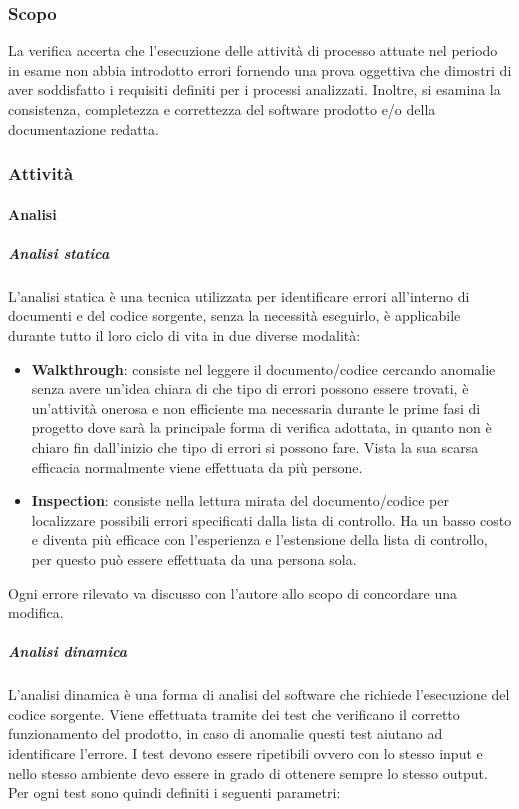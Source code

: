 \subsubsection{Scopo}
La verifica accerta che l'esecuzione delle attività di processo attuate nel periodo in esame non abbia introdotto errori fornendo una prova oggettiva che dimostri di aver soddisfatto i requisiti definiti per i processi analizzati.
Inoltre, si esamina la consistenza, completezza e correttezza del software prodotto e/o della documentazione redatta.
\subsubsection{Attività}
\paragraph{Analisi}
\subparagraph{Analisi statica} \Spazio
L'analisi statica è una tecnica utilizzata per identificare errori all'interno di documenti e del codice sorgente, senza la necessità eseguirlo, è applicabile durante tutto il loro ciclo di vita in due diverse modalità:
\begin{itemize}
	\item \textbf{Walkthrough}:
	      consiste nel leggere il documento/codice cercando anomalie senza avere un'idea chiara di che tipo di errori possono essere trovati, è un'attività onerosa e non efficiente ma necessaria durante le prime fasi di progetto dove sarà la principale forma di verifica adottata, in quanto non è chiaro fin dall'inizio che tipo di errori si possono fare.
	      Vista la sua scarsa efficacia normalmente viene effettuata da più persone.
	\item \textbf{Inspection}:
	      consiste nella lettura mirata del documento/codice per localizzare possibili errori specificati dalla lista di controllo. Ha un basso costo e diventa più efficace con l'esperienza e l'estensione della lista di controllo, per questo può essere effettuata da una persona sola.
\end{itemize}
Ogni errore rilevato va discusso con l'autore allo scopo di concordare una modifica.
\subparagraph{Analisi dinamica} \Spazio
L'analisi dinamica è una forma di analisi del software che richiede l'esecuzione del codice sorgente. Viene effettuata tramite dei test che verificano il corretto funzionamento del prodotto, in caso di anomalie questi test aiutano ad identificare l'errore.
I test devono essere ripetibili ovvero con lo stesso input e nello stesso ambiente devo essere in grado di ottenere sempre lo stesso output. Per ogni test sono quindi definiti i seguenti parametri:
